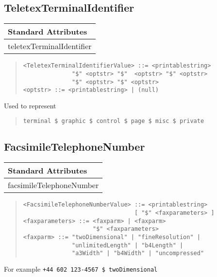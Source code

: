 \subsection{TeletexTerminalIdentifier}
\begin{center}\small
\begin{tabular}{|l|}\hline
Standard Attributes \\ \hline
	teletexTerminalIdentifier\\
\hline
\end{tabular}
\end{center}

\begin{quote}\begin{verbatim}
<TeletexTerminalIdentifierValue> ::= <printablestring> 
              "$" <optstr> "$"  <optstr> "$" <optstr> 
              "$" <optstr> "$" <optstr>
<optstr> ::= <printablestring> | (null)
\end{verbatim}\end{quote}
Used to represent
\begin{quote}\begin{verbatim}
terminal $ graphic $ control $ page $ misc $ private
\end{verbatim}\end{quote}

\subsection{FacsimileTelephoneNumber}
\begin{center}\small
\begin{tabular}{|l|}\hline
Standard Attributes \\ \hline
	facsimileTelephoneNumber\\
\hline
\end{tabular}
\end{center}
\begin{quote}\begin{verbatim}
<FacsimileTelephoneNumberValue> ::= <printablestring> 
                                [ "$" <faxparameters> ]
<faxparameters> ::= <faxparm> | <faxparm> 
                    "$" <faxparameters>
<faxparm> ::= "twoDimensional" | "fineResolution" | 
              "unlimitedLength" | "b4Length" | 
              "a3Width" | "b4Width" | "uncompressed"
\end{verbatim}\end{quote}
For example \verb"+44 602 123-4567 $ twoDimensional"


